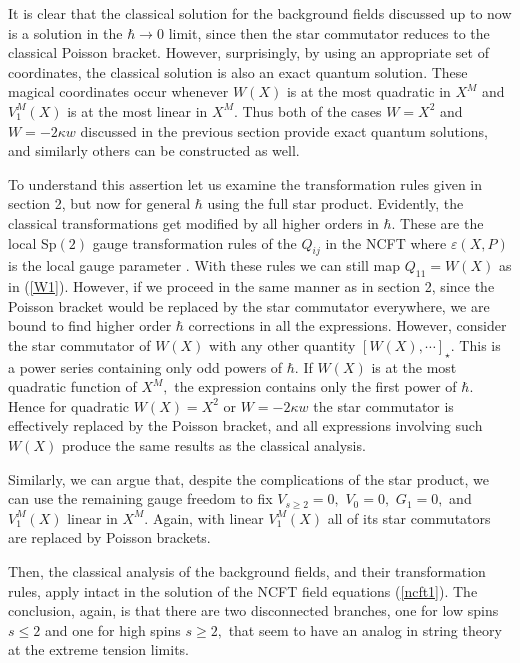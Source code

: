 \documentclass[a4paper,12pt]{article}
\begin{document}
It is clear that the classical solution for the background fields discussed
up to now is a solution in the $\hbar \rightarrow 0$ limit, since then the
star commutator reduces to the classical Poisson bracket. However,
surprisingly, by using an appropriate set of coordinates, the classical
solution is also an exact quantum solution. These magical coordinates occur
whenever $W\left( X\right) $ is at the most quadratic in $X^{M}$ and $%
V_{1}^{M}\left( X\right) $ is at the most linear in $X^{M}.$ Thus both of
the cases $W=X^{2}$ and $W=-2\kappa w$ discussed in the previous section
provide exact quantum solutions, and similarly others can be constructed as
well.

To understand this assertion let us examine the transformation rules given
in section 2, but now for general $\hbar $ using the full star product.
Evidently, the classical transformations get modified by all higher orders
in $\hbar $. These are the local Sp$\left( 2\right) $ gauge transformation
rules of the $Q_{ij}$ in the NCFT where $\varepsilon \left( X,P\right) $ is
the local gauge parameter \cite{ncsp}. With these rules we can still map $%
Q_{11}=W\left( X\right) $ as in (\ref{W1}). However, if we proceed in the
same manner as in section 2, since the Poisson bracket would be replaced by
the star commutator everywhere, we are bound to find higher order $\hbar $
corrections in all the expressions. However, consider the star commutator of
$W\left( X\right) $ with any other quantity $\left[ W\left( X\right) ,\cdots %
\right] _{\star }.$ This is a power series containing only odd powers of $%
\hbar .$ If $W\left( X\right) $ is at the most quadratic function of $X^{M},$
the expression contains only the first power of $\hbar $. Hence for
quadratic $W\left( X\right) =X^{2}$ or $W=-2\kappa w$ the star commutator is
effectively replaced by the Poisson bracket, and all expressions involving
such $W\left( X\right) $ produce the same results as the classical analysis.

Similarly, we can argue that, despite the complications of the star product,
we can use the remaining gauge freedom to fix $V_{s\geq 2}=0,$ $V_{0}=0,$ $%
G_{1}=0,$ and $V_{1}^{M}\left( X\right) $ linear in $X^{M}.$ Again, with
linear $V_{1}^{M}\left( X\right) $ all of its star commutators are replaced
by Poisson brackets.

Then, the classical analysis of the background fields, and their
transformation rules, apply intact in the solution of the NCFT field
equations (\ref{ncft1}). The conclusion, again, is that there are two
disconnected branches, one for low spins $s\leq 2$ and one for high spins $%
s\geq 2,$ that seem to have an analog in string theory at the extreme
tension limits.
\end{document}
